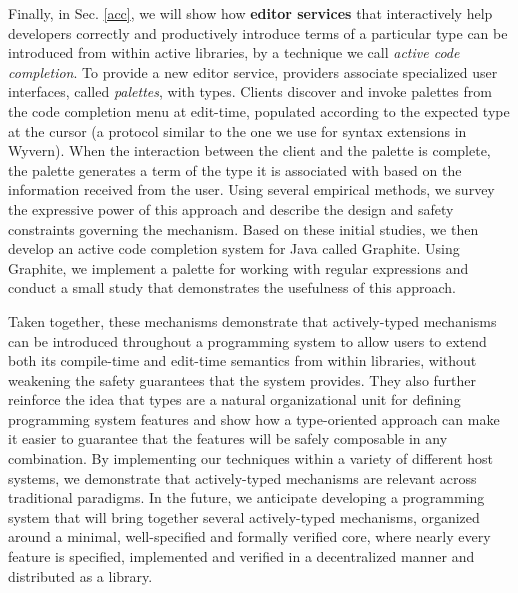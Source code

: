Finally, in Sec. \ref{acc}, we will show how \textbf{editor services} that interactively help developers correctly and productively introduce terms of a particular type can be introduced from within active libraries, by a technique we call \emph{active code completion}. To provide a new editor service, providers associate
specialized user interfaces, called \emph{palettes}, with types. Clients discover and invoke palettes from the code completion menu at edit-time, populated according to the expected type at the cursor (a protocol similar to the one we use for syntax extensions in Wyvern). When the interaction between the client and the palette is complete, the palette generates a term of the type it is associated with based on the information received from the user. Using several empirical
methods, we survey\- the expressive power of this approach and describe the design and safety constraints governing
the mechanism. Based on these initial studies, we then develop an active code completion system for Java called Graphite. Using Graphite,
we implement a palette for working with regular expressions and conduct a small study that demonstrates the usefulness of this approach.

Taken together, these mechanisms demonstrate that actively-typed mechanisms can be introduced throughout a programming system to allow users to extend both its compile-time and edit-time semantics from within libraries, without  weakening the safety guarantees that the system provides. They also further reinforce the idea that types are a natural organizational unit for defining programming system features and show how a type-oriented approach can make it easier to guarantee that the features will be safely composable in any combination. By implementing our techniques within a variety of different host systems, we demonstrate that actively-typed mechanisms are relevant across traditional paradigms. In the future, we anticipate developing a programming system that will bring together several actively-typed mechanisms, organized around a minimal, well-specified and formally verified core, where nearly every feature is specified, implemented and verified in a decentralized manner and distributed as a library. 

